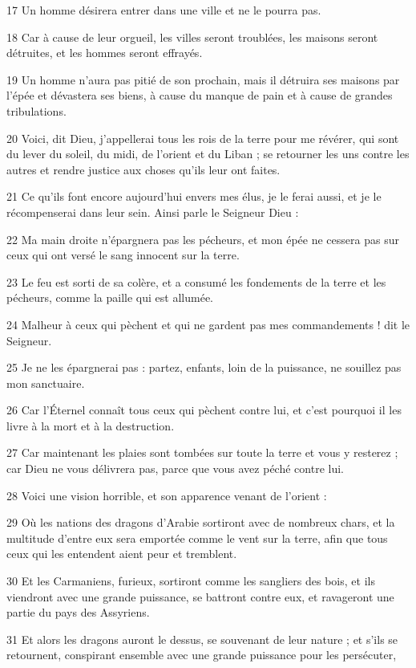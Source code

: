 \par 17 Un homme désirera entrer dans une ville et ne le pourra pas.
\par 18 Car à cause de leur orgueil, les villes seront troublées, les maisons seront détruites, et les hommes seront effrayés.
\par 19 Un homme n'aura pas pitié de son prochain, mais il détruira ses maisons par l'épée et dévastera ses biens, à cause du manque de pain et à cause de grandes tribulations.
\par 20 Voici, dit Dieu, j'appellerai tous les rois de la terre pour me révérer, qui sont du lever du soleil, du midi, de l'orient et du Liban ; se retourner les uns contre les autres et rendre justice aux choses qu'ils leur ont faites.
\par 21 Ce qu'ils font encore aujourd'hui envers mes élus, je le ferai aussi, et je le récompenserai dans leur sein. Ainsi parle le Seigneur Dieu :
\par 22 Ma main droite n'épargnera pas les pécheurs, et mon épée ne cessera pas sur ceux qui ont versé le sang innocent sur la terre.
\par 23 Le feu est sorti de sa colère, et a consumé les fondements de la terre et les pécheurs, comme la paille qui est allumée.
\par 24 Malheur à ceux qui pèchent et qui ne gardent pas mes commandements ! dit le Seigneur.
\par 25 Je ne les épargnerai pas : partez, enfants, loin de la puissance, ne souillez pas mon sanctuaire.
\par 26 Car l'Éternel connaît tous ceux qui pèchent contre lui, et c'est pourquoi il les livre à la mort et à la destruction.
\par 27 Car maintenant les plaies sont tombées sur toute la terre et vous y resterez ; car Dieu ne vous délivrera pas, parce que vous avez péché contre lui.
\par 28 Voici une vision horrible, et son apparence venant de l'orient :
\par 29 Où les nations des dragons d'Arabie sortiront avec de nombreux chars, et la multitude d'entre eux sera emportée comme le vent sur la terre, afin que tous ceux qui les entendent aient peur et tremblent.
\par 30 Et les Carmaniens, furieux, sortiront comme les sangliers des bois, et ils viendront avec une grande puissance, se battront contre eux, et ravageront une partie du pays des Assyriens.
\par 31 Et alors les dragons auront le dessus, se souvenant de leur nature ; et s'ils se retournent, conspirant ensemble avec une grande puissance pour les persécuter,
